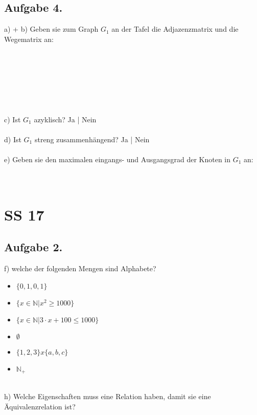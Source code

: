 \documentclass[11pt]{article} %
\begin{document}
\subsection{Aufgabe 4.}
a) + b) Geben sie zum Graph $G_1$ an der Tafel die Adjazenzmatrix und die Wegematrix an: \\
\ \\
\ \\
\ \\
\ \\
\ \\
\ \\
\ \\
c) Ist $G_1$ azyklisch? \quad Ja \quad | \quad Nein \\
\ \\
d) Ist $G_1$ streng zusammenhängend? \quad Ja \quad | \quad Nein \\
\ \\
e) Geben sie den maximalen eingangs- und Ausgangsgrad der Knoten in $G_1$ an:
\ \\
\ \\
\ \\
\section{SS 17}
\subsection{Aufgabe 2.}
f) welche der folgenden Mengen sind Alphabete? \\
\begin{itemize}
	\item $\{ 0, 1, 0, 1 \}$
	\item $\{ x \in \mathbb{N} | x^2 \geq 1000 \}$
	\item $\{ x \in \mathbb{N} | 3 \cdot x + 100 \leq 1000 \}$
	\item $\emptyset$
	\item $\{ 1,2,3 \} x \{ a,b,c \}$
	\item $\mathbb{N}_+$
\end{itemize}
\ \\
h) Welche Eigenschaften muss eine Relation haben, damit sie eine Äquivalenzrelation ist? \\
\ \\
\ \\
\ \\
\end{document}
